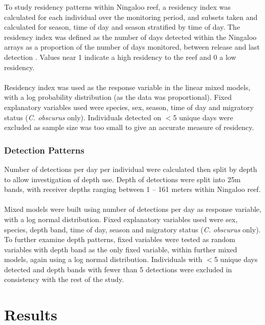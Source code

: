\documentclass[11pt,a4paper]{article}
\begin{document}
	To study residency patterns within Ningaloo reef, a residency index was calculated for each individual over the monitoring period, and subsets taken and calculated for season, time of day and season stratified by time of day. The residency index was defined as the number of days detected within the Ningaloo arrays as a proportion of the number of days monitored, between release and last detection \citep{Espinoza2016}. Values near 1 indicate a high residency to the reef and 0 a low residency. \\
	\\
	Residency index was used as the response variable in the linear mixed models, with a log probability distribution (as the data was proportional). Fixed explanatory variables used were species, sex, season, time of day and migratory status (\textit{C. obscurus} only). Individuals detected on $<$5 unique days were excluded as sample size was too small to give an accurate measure of residency. \\
	
	
	\subsubsection{Detection Patterns}
	
	Number of detections per day per individual were calculated then split by depth to allow investigation of depth use. Depth of detections were split into 25m bands, with receiver depths ranging between 1 – 161 meters within Ningaloo reef. \\
	\\
	Mixed models were built using number of detections per day as response variable, with a log normal distribution. Fixed explanatory variables used were sex, species, depth band, time of day, season and migratory status (\textit{C. obscurus} only). To further examine depth patterns, fixed variables were tested as random variables with depth band as the only fixed variable, within further mixed models, again using a log normal distribution. Individuals with $<$5 unique days detected and depth bands with fewer than 5 detections were excluded in consistency with the rest of the study.\\
	
	
	\newpage
	
	\section{Results}
	
\end{document}

